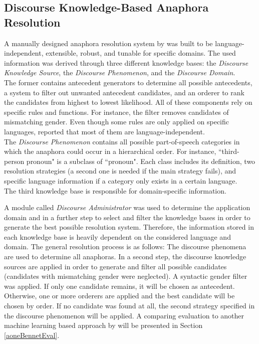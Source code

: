 \subsection{Discourse Knowledge-Based Anaphora Resolution}
\label{aonediscourseMD}
A manually designed anaphora resolution system by \citep{aone1993language} was built to be language-independent, extensible, robust, and tunable for specific domains. The used information was derived through three different knowledge bases: the \textit{Discourse Knowledge Source}, the \textit{Discourse Phenomenon}, and the \textit{Discourse Domain}. \\
The former contains antecedent generators to determine all possible antecedents, a system to filter out unwanted antecedent candidates, and an orderer to rank the candidates from highest to lowest likelihood. All of these components rely on specific rules and functions. For instance, the filter removes candidates of mismatching gender. Even though some rules are only applied on specific languages, \cite{aone1993language} reported that most of them are language-independent.\\
The \textit{Discourse Phenomenon} contains all possible part-of-speech categories in which the anaphora could occur in a hierarchical order. For instance, ``third-person pronoun" is a subclass of ``pronoun". Each class includes its definition, two resolution strategies (a second one is needed if the main strategy fails), and specific language information if a category only exists in a certain language.\\
The third knowledge base is responsible for domain-specific information. 

A module called \textit{Discourse Administrator} was used to determine the application domain and in a further step to select and filter the knowledge bases in order to generate the best possible resolution system. Therefore, the information stored in each knowledge base is heavily dependent on the considered language and domain. The general resolution process is as follows: The discourse phenomena are used to determine all anaphoras. In a second step, the discourse knowledge sources are applied in order to generate and filter all possible candidates (candidates with mismatching gender were neglected). A syntactic gender filter was applied. If only one candidate remains, it will be chosen as antecedent. Otherwise, one or more orderers are applied and the best candidate will be chosen by order. If no candidate was found at all, the second strategy specified in the discourse phenomenon will be applied. A comparing evaluation to another machine learning based approach by \cite{aone1995evaluating} will be presented in Section \ref{aoneBennetEval}.

